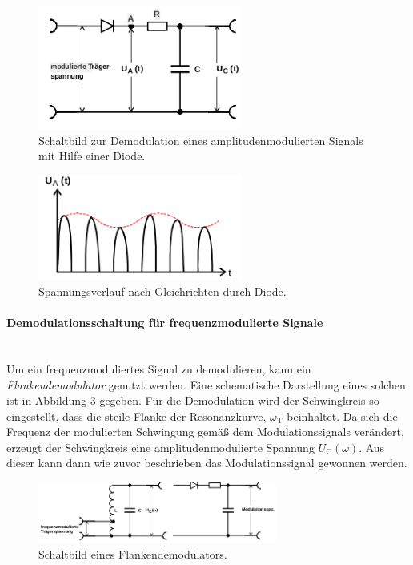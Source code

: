 \begin{figure}
  \centering
  \includegraphics[width=0.6\textwidth]{figures/gleichrichterdiode.PNG}
  \caption{Schaltbild zur Demodulation eines amplitudenmodulierten Signals mit Hilfe einer Diode.\cite{sample}}
  \label{fig:gleichrichterdiode}
\end{figure}

\begin{figure}
\centering
\includegraphics[width=0.6\textwidth]{figures/spannung_diode.PNG}
\caption{Spannungsverlauf nach Gleichrichten durch Diode.\cite{sample}}
\label{fig:gleichgerichtet}
\end{figure}

\FloatBarrier

\paragraph{Demodulationsschaltung für frequenzmodulierte Signale}
\mbox{}\\
Um ein frequenzmoduliertes Signal zu demodulieren, kann ein
\textit{Flankendemodulator} genutzt werden.
Eine schematische Darstellung eines solchen ist in Abbildung \ref{fig:flankenmodulator}
gegeben. Für die Demodulation wird der Schwingkreis so eingestellt, dass
die steile Flanke der Resonanzkurve, $\omega_{\text{T}}$ beinhaltet.
Da sich die Frequenz der modulierten Schwingung gemäß dem Modulationssignals
verändert, erzeugt der Schwingkreis eine amplitudenmodulierte Spannung
$U_{\text{C}}(\omega)$. Aus dieser kann dann wie zuvor beschrieben das
Modulationssignal gewonnen werden.

\begin{figure}
\centering
\includegraphics[width=0.7\textwidth]{figures/flankenmodulator.PNG}
\caption{Schaltbild eines Flankendemodulators.\cite{sample}}
\label{fig:flankenmodulator}
\end{figure}
